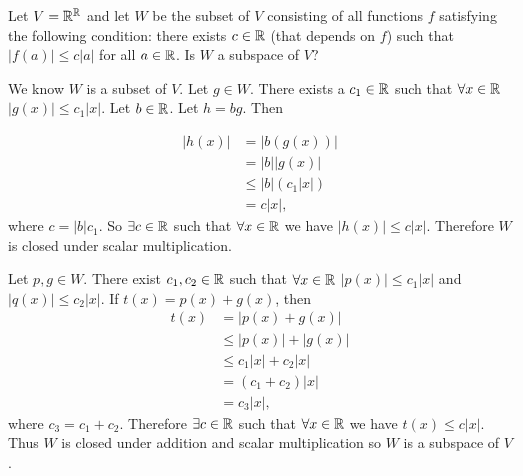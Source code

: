 \begin{problem}[Golan 85]
Let $V = \mathbb{R}^{\mathbb{R}}$ and let $W$ be the subset of $V$ consisting of all
functions $f$ satisfying the following condition: there exists $c\in \mathbb{R}$
(that depends on $f$) such that $|f(a)|\leq c|a|$ for all $a\in \mathbb{R}$.
Is $W$ a subspace of $V$?

\end{problem}
\smallskip
\begin{solution}

We know $W$ is a subset of $V$. Let $g \in W$. There exists a $c_1 \in \mathbb{R}$ such that $\forall x \in \mathbb{R}$  $|g(x)| \leq c_1|x|$.
Let $b \in \mathbb{R}$. Let $h = b g$. Then

\begin{align*}
|h(x)| & = |b(g(x))| \\
       & = |b| |g(x)| \\
       & \leq  |b|(c_1|x|) \\
       & =  c|x|,
\end{align*}
where $c = |b|c_1$. So $\exists c \in \mathbb{R}$ such that $\forall x \in \mathbb{R}$ we have $|h(x)| \leq c|x|$.
Therefore $W$ is closed under scalar multiplication.  

Let $p, g \in W$.  There exist $c_1,c_2 \in \mathbb{R}$ such that $\forall x \in \mathbb{R}$
$|p(x)| \leq c_1|x|$ and $|q(x)| \leq c_2|x|$.
If $t(x) = p(x) + g(x)$, then
\begin{align*}
t(x) & =  |p(x) + g(x)| \\
     & \leq  |p(x)| + |g(x)| \\
     & \leq c_1|x| + c_2|x| \\
     & =  (c_1+c_2)|x| \\
     & = c_3|x|,
\end{align*}
where $c_3 = c_1 + c_2$. Therefore $\exists c \in \mathbb{R}$ such that $\forall x \in \mathbb{R}$ we have
$t(x) \leq c|x|$.
Thus $W$ is closed under addition and scalar multiplication so $W$ is a subspace of $V$.
\end{solution}
\probskip



